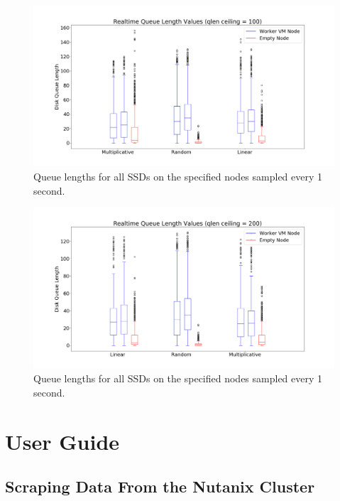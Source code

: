 \documentclass[12pt]{article}
\begin{document}
  \begin{figure}[!htb]
    \centering
    \includegraphics[scale=0.32]{images/qlen_100_box.png} 
    \caption{Queue lengths for all SSDs on the specified nodes sampled every 1
             second.}
    \label{fig:qlen_100}
  \end{figure}

  \begin{figure}[!htb]
    \centering
    \includegraphics[scale=0.32]{images/qlen_200_box.png} 
    \caption{Queue lengths for all SSDs on the specified nodes sampled every 1
             second.}
    \label{fig:qlen_200}
  \end{figure}

\newpage
\section{User Guide}

  \subsection{Scraping Data From the Nutanix Cluster}
\end{document}
